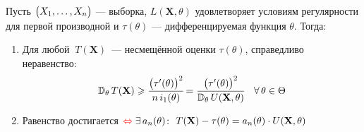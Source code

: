 \begin{namedthm}
    Пусть $\bigl( X_1, \ldots, X_n \bigr)$ — выборка, $L(\mathbf{X}, \theta)$ удовлетворяет условиям регулярности для первой производной и $\tau(\theta)$  —  дифференцируемая функция $\theta$. Тогда:
    \begin{enumerate}
        \item Для любой $~T(\mathbf{X})$~--- несмещённой оценки $\tau(\theta)$, справедливо неравенство:
        \begin{gather*}
            \mathbb{D}_{\theta}\, T(\mathbf{X}) \geqslant 
            \cfrac{\bigl( \tau'(\theta) \bigr)^2}{n \, i_1(\theta)} = 
            \cfrac{\bigl( \tau'(\theta) \bigr)^2}{\mathbb{D}_{\theta}\, U(\mathbf{X}, \theta)}
            \quad \forall \, \theta \in \Theta
        \end{gather*}
        
        \item Равенство достигается ${\color{red}\Leftrightarrow} \; \exists \, a_n(\theta)\colon ~ T(\mathbf{X})-\tau(\theta)=a_{n}(\theta) \cdot U(\mathbf{X}, \theta)$
    \end{enumerate}
\end{namedthm}

